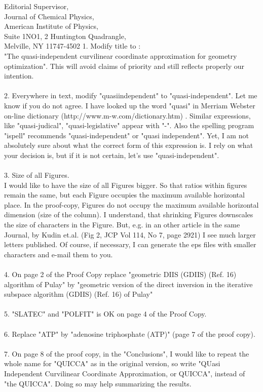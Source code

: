 \begin{letter}{
Editorial Supervisor, \\
Journal of Chemical Physics, \\
American Institute of Physics, \\
Suite 1NO1, 2 Huntington Quadrangle, \\
Melville, NY 11747-4502 }
1. Modify title to : \\
"The quasi-independent curvilinear coordinate approximation for geometry optimization". This will avoid claims of priority and still reflects
properly our intention.
\\ \\
2. Everywhere in text, modify "quasiindependent" to "quasi-independent".
Let me know if you do not agree. I have looked up the word "quasi"
in Merriam Webster on-line dictionary (http://www.m-w.com/dictionary.htm)
. Similar expressions, like "quasi-judical", "quasi-legislative"
appear with "-". 
Also the spelling program "ispell" recommends "quasi-independent" 
or "quasi independent". 
Yet, I am not absolutely sure about what the correct form of this expression is. 
I rely on what your decision is, but if it is not certain, let's use
"quasi-independent".
\\ \\
3. Size of all Figures. \\
I would like to have the size of all Figures bigger. So that ratios
within figures remain the same, but each Figure occupies the maximum
available horizontal place. In the proof-copy, Figures do not occupy
the maximum available horizontal dimension (size of the column).
I understand, that shrinking Figures downscales the size of characters
in the Figure. But, e.g. in an other article in the same Journal,
by Kudin et.al. (Fig 2, JCP Vol 114, No 7, page 2921) I see much larger
letters published.
Of course, if necessary, I can generate the eps files
with smaller characters and e-mail them to you.
\\ \\
4. On page 2 of the Proof Copy replace "geometric DIIS (GDIIS) (Ref. 16) algorithm of Pulay" by
"geometric version of the direct inversion in the iterative
subspace algorithm (GDIIS) (Ref. 16) of Pulay" 
\\ \\
5. "SLATEC" and "POLFIT" is OK on page 4 of the Proof Copy.
\\ \\
6. Replace "ATP" by "adenosine triphosphate (ATP)"
(page 7 of the proof copy). 
\\ \\
7. On page 8 of the proof copy, in the "Conclusions", I would like 
to repeat the whole name for "QUICCA" as in the original version,
so write "QUasi Independent Curvilinear Coordinate Approximation, 
or QUICCA", instead of "the QUICCA". Doing so may help 
summarizing the results.

\end{letter}
